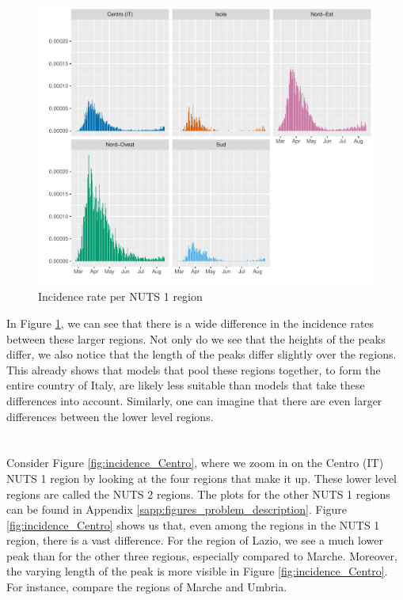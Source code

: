 \documentclass[12pt]{article}
\begin{document}
	\begin{figure}[ht]
	    \centering
	    \includegraphics[width=\textwidth]{output/infective_rate_per_NUTS1.pdf}
	    \caption{Incidence rate per NUTS 1 region}
	    \label{fig:incidence_per_NUTS1}
	\end{figure}
	
	In Figure \ref{fig:incidence_per_NUTS1}, we can see that there is a wide difference in the incidence rates between these larger regions. Not only do we see that the heights of the peaks differ, we also notice that the length of the peaks differ slightly over the regions. This already shows that models that pool these regions together, to form the entire country of Italy, are likely less suitable than models that take these differences into account. Similarly, one can imagine that there are even larger differences between the lower level regions. \\ \\ \\
	
	Consider Figure \ref{fig:incidence_Centro}, where we zoom in on the Centro (IT) NUTS 1 region by looking at the four regions that make it up. These lower level regions are called the NUTS 2 regions. The plots for the other NUTS 1 regions can be found in Appendix \ref{sapp:figures_problem_description}. Figure \ref{fig:incidence_Centro} shows us that, even among the regions in the NUTS 1 region, there is a vast difference. For the region of Lazio, we see a much lower peak than for the other three regions, especially compared to Marche. Moreover, the varying length of the peak is more visible in Figure \ref{fig:incidence_Centro}. For instance, compare the regions of Marche and Umbria. \\
	
\end{document}
